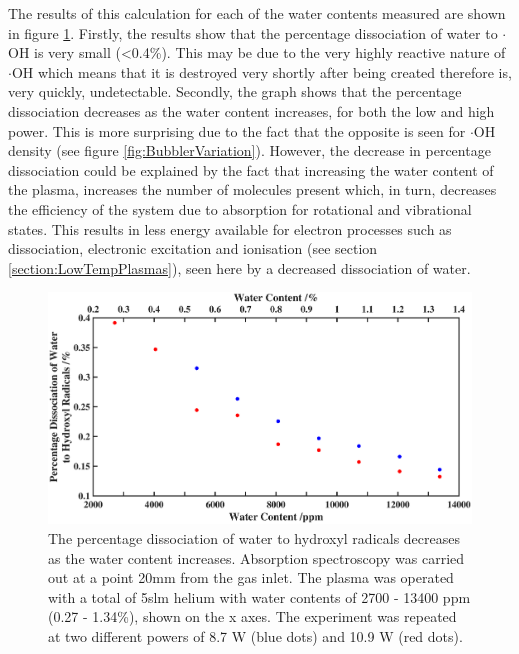 \documentclass[11pt, oneside]{article}   	%
\begin{document}
The results of this calculation for each of the water contents measured are shown in figure \ref{fig:BubblerDissociation}.
Firstly, the results show that the percentage dissociation of water to $\cdot$OH is very small (\textless 0.4\%). This may be due to the very highly reactive nature of $\cdot$OH which means that it is destroyed very shortly after being created therefore is, very quickly, undetectable.
Secondly, the graph shows that the percentage dissociation decreases as the water content increases, for both the low and high power.
This is more surprising due to the fact that the opposite is seen for $\cdot$OH density (see figure \ref{fig:BubblerVariation}).
However, the decrease in percentage dissociation could be explained by the fact that increasing the water content of the plasma, increases the number of molecules present which, in turn, decreases the efficiency of the system due to absorption for rotational and vibrational states.
This results in less energy available for electron processes such as dissociation, electronic excitation and ionisation (see section \ref{section:LowTempPlasmas}), seen here by a decreased dissociation of water.





\begin{figure}
    \centering
    \includegraphics[width=\textwidth]{Figures/WaterDissociation2.eps}
    \caption{The percentage dissociation of water to hydroxyl radicals decreases as the water content increases. Absorption spectroscopy was carried out at a point 20mm from the gas inlet. The plasma was operated with a total of 5slm helium with water contents of 2700 - 13400 ppm (0.27 - 1.34\%), shown on the x axes. The experiment was repeated at two different powers of 8.7 W (blue dots) and 10.9 W (red dots).}
    \label{fig:BubblerDissociation}
\end{figure}
\end{document}
